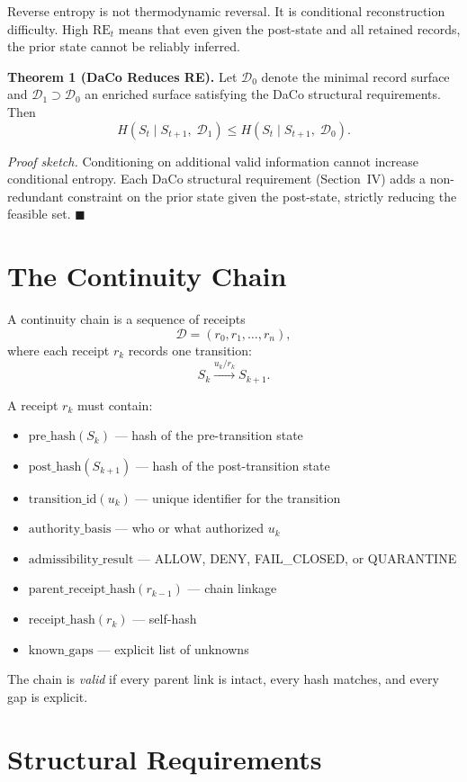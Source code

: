 \documentclass[letterpaper,10pt,conference]{ieeeconf}
\newcommand{\RE}{\mathrm{RE}}
\newcommand{\St}{S_t}
\newcommand{\Stp}{S_{t+1}}
\newcommand{\Chain}{\mathcal{D}}
\begin{document}
Reverse entropy is not thermodynamic reversal. It is conditional reconstruction difficulty. High $\RE_t$ means that even given the post-state and all retained records, the prior state cannot be reliably inferred.

\textbf{Theorem 1 (DaCo Reduces RE).} Let $\Chain_0$ denote the minimal record surface and $\Chain_1 \supset \Chain_0$ an enriched surface satisfying the DaCo structural requirements. Then
\[
H(\St \mid \Stp,\; \Chain_1) \le H(\St \mid \Stp,\; \Chain_0).
\]

\textit{Proof sketch.} Conditioning on additional valid information cannot increase conditional entropy. Each DaCo structural requirement (Section~IV) adds a non-redundant constraint on the prior state given the post-state, strictly reducing the feasible set. \hfill $\blacksquare$

\section{The Continuity Chain}

A continuity chain is a sequence of receipts
\[
\Chain = (r_0, r_1, \ldots, r_n),
\]
where each receipt $r_k$ records one transition:
\[
S_{k} \xrightarrow{u_k / r_k} S_{k+1}.
\]

A receipt $r_k$ must contain:
\begin{itemize}
\item $\text{pre\_hash}(S_k)$ --- hash of the pre-transition state
\item $\text{post\_hash}(S_{k+1})$ --- hash of the post-transition state
\item $\text{transition\_id}(u_k)$ --- unique identifier for the transition
\item $\text{authority\_basis}$ --- who or what authorized $u_k$
\item $\text{admissibility\_result}$ --- ALLOW, DENY, FAIL\_CLOSED, or QUARANTINE
\item $\text{parent\_receipt\_hash}(r_{k-1})$ --- chain linkage
\item $\text{receipt\_hash}(r_k)$ --- self-hash
\item $\text{known\_gaps}$ --- explicit list of unknowns
\end{itemize}

The chain is \emph{valid} if every parent link is intact, every hash matches, and every gap is explicit.

\section{Structural Requirements}
\end{document}
